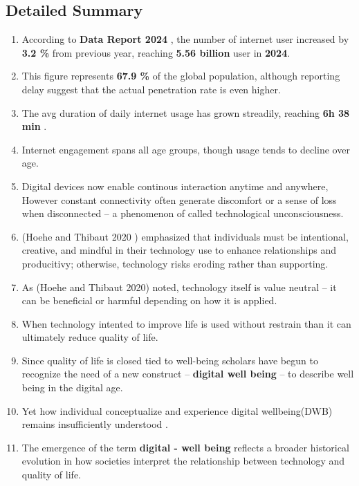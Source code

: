 \documentclass[12pt]{article}
\begin{document}
\subsection{Detailed Summary}
\begin{enumerate}
    \item According to \textbf{Data Report 2024} \cite{datareportal2024digital}, the number of internet user increased by \textbf{3.2 \% } from previous year, reaching \textbf{5.56 billion } user in \textbf{2024}. 
    \item This  figure represents \textbf{67.9 \%} of the global population, although reporting delay suggest that the actual penetration rate is even higher.
    \item The avg duration of daily internet usage has grown streadily, reaching \textbf{6h 38 min} .
    \item Internet engagement spans all age groups, though usage tends to decline over age.
    \item Digital devices now enable continous interaction anytime and anywhere, However constant connectivity often generate discomfort or a sense of loss when disconnected -- a phenomenon of called technological unconsciousness.
    \item (Hoehe and Thibaut 2020 )\cite{hoehe2020going} emphasized that individuals must be intentional, creative, and mindful in their technology use to enhance relationships and producitivy; otherwise, technology risks eroding rather than supporting.
    \item   As (Hoehe and Thibaut 2020) \cite{hoehe2020going} noted, technology itself is value neutral -- it can be beneficial or harmful depending on how it is applied.
    \item When technology intented to improve life is used without restrain than it can 
    ultimately reduce quality of life.
    \item Since quality of life is closed tied to well-being \cite{upton2015quality}  \cite{weil1997technostress} scholars have begun to recognize the need of a new construct -- \textbf{digital well being} -- to describe well being in the digital age.
    \item Yet how individual conceptualize and experience digital wellbeing(DWB) remains insufficiently understood \cite{nguyen2022everyday}.
    \item The emergence of the term \textbf{digital - well being } reflects a broader historical evolution in how societies interpret the relationship between technology and quality of life.

\end{enumerate}
\end{document}
